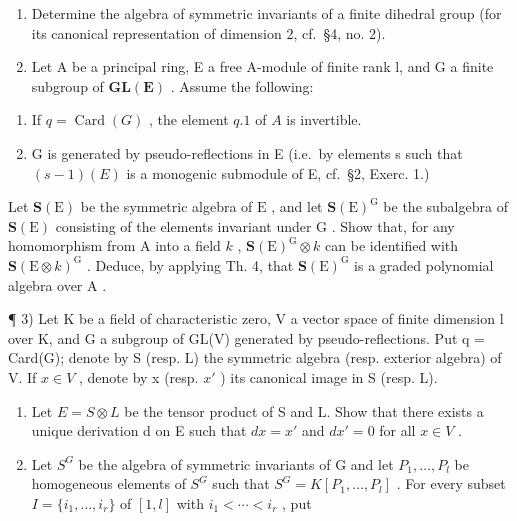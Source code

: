 
\begin{enumerate}
\def\labelenumi{\arabic{enumi})}
\item
  Determine the algebra of symmetric invariants of a finite dihedral group (for its canonical representation of dimension 2, cf.~§4, no. 2).
\item
  Let A be a principal ring, E a free A-module of finite rank l, and G a finite subgroup of \(\mathbf{GL}(\mathbf{E})\) . Assume the following:
\end{enumerate}

\begin{enumerate}
\def\labelenumi{(\roman{enumi})}
\item
  If \(q = \operatorname{Card}(G)\) , the element \(q.1\) of \(A\) is invertible.
\item
  G is generated by pseudo-reflections in E (i.e.~by elements s such that \((s - 1)(E)\) is a monogenic submodule of E, cf.~§2, Exerc. 1.)
\end{enumerate}

Let \(\mathbf{S}(\mathrm{E})\) be the symmetric algebra of \(\mathrm{E}\) , and let \(\mathbf{S}(\mathrm{E})^{\mathrm{G}}\) be the subalgebra of \(\mathbf{S}(\mathrm{E})\) consisting of the elements invariant under \(\mathrm{G}\) . Show that, for any homomorphism from \(\mathrm{A}\) into a field \(k\) , \(\mathbf{S}(\mathrm{E})^{\mathrm{G}} \otimes k\) can be identified with \(\mathbf{S}(\mathrm{E} \otimes k)^{\mathrm{G}}\) . Deduce, by applying Th. 4, that \(\mathbf{S}(\mathrm{E})^{\mathrm{G}}\) is a graded polynomial algebra over \(\mathrm{A}\) .

¶ 3) Let K be a field of characteristic zero, V a vector space of finite dimension l over K, and G a subgroup of GL(V) generated by pseudo-reflections. Put q = Card(G); denote by S (resp. L) the symmetric algebra (resp. exterior algebra) of V. If \(x \in V\) , denote by x (resp. \(x'\) ) its canonical image in S (resp. L).

\begin{enumerate}
\def\labelenumi{\alph{enumi})}
\item
  Let \(E = S \otimes L\) be the tensor product of S and L. Show that there exists a unique derivation d on E such that \(dx = x'\) and \(dx' = 0\) for all \(x \in V\) .
\item
  Let \(S^{G}\) be the algebra of symmetric invariants of G and let \(P_{1},\ldots,P_{l}\) be homogeneous elements of \(S^{G}\) such that \(S^{G}=K[P_{1},\ldots,P_{l}]\) . For every subset \(I=\{i_{1},\ldots,i_{r}\}\) of \([1,l]\) with \(i_{1}<\cdots<i_{r}\) , put
\end{enumerate}

